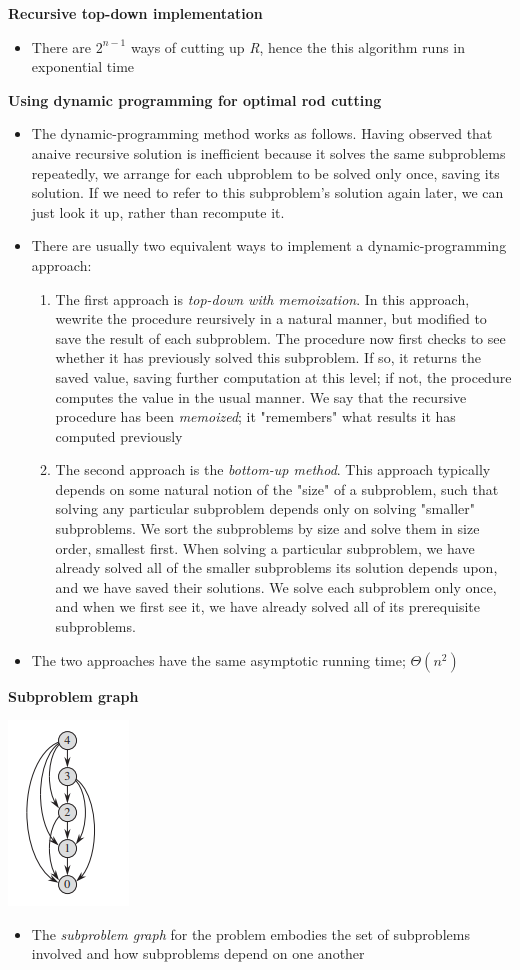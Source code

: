 \documentclass{report}
\begin{document}
\textbf{Recursive top-down implementation}
\begin{itemize}
    \item There are $2^{n - 1}$ ways of cutting up \textit{R}, hence the this algorithm runs in exponential time
\end{itemize}
\textbf{Using dynamic programming for optimal rod cutting}
\begin{itemize}
    \item The dynamic-programming method works as follows. Having observed that anaive recursive solution is inefficient because it solves the same subproblems repeatedly, we arrange for each ubproblem to be solved only once, saving its solution. If we need to refer to this subproblem's solution again later, we can just look it up, rather than recompute it.
    \item There are usually two equivalent ways to implement a dynamic-programming approach:
    \begin{enumerate}
        \item The first approach is \textit{top-down with memoization}. In this approach, wewrite the procedure reursively in a natural manner, but modified to save the result of each subproblem. The procedure now first checks to see whether it has previously solved this subproblem. If so, it returns the saved value, saving further computation at this level; if not, the procedure computes the value in the usual manner. We say that the recursive procedure has been \textit{memoized}; it "remembers" what results it has computed previously
        \item The second approach is the \textit{bottom-up method}. This approach typically depends on some natural notion of the "size" of a subproblem, such that solving any particular subproblem depends only on solving "smaller" subproblems. We sort the subproblems by size and solve them in size order, smallest first. When solving a particular subproblem, we have already solved all of the smaller subproblems its solution depends upon, and we have saved their solutions. We solve each subproblem only once, and when we first see it, we have already solved all of its prerequisite subproblems.
    \end{enumerate}
    \item The two approaches have the same asymptotic running time; $\Theta(n^2)$
\end{itemize}
\textbf{Subproblem graph}
\begin{center}
    \includegraphics[height = 5 cm]{../entities/subproblem_graph.png}
\end{center}
\begin{itemize}
    \item The \textit{subproblem graph} for the problem embodies the set of subproblems involved and how subproblems depend on one another
\end{itemize}
\end{document}
